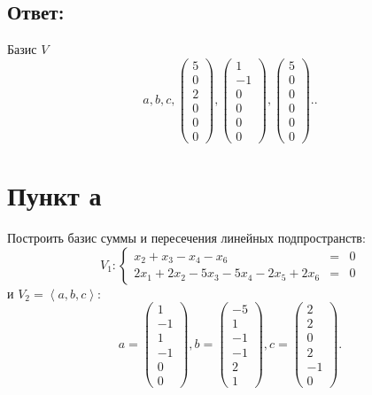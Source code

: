 \documentclass[12pt]{article}
\begin{document}
    \subsection*{Ответ:}
    Базис $V$
    \[
        a, b, c ,
        \begin{pmatrix}
            5 \\ 0 \\ 2 \\ 0 \\ 0 \\ 0
        \end{pmatrix} ,
        \begin{pmatrix}
            1 \\ -1 \\ 0 \\ 0 \\ 0 \\ 0
        \end{pmatrix} ,
        \begin{pmatrix}
            5 \\ 0 \\ 0 \\ 0 \\ 0 \\ 0
        \end{pmatrix} .
        .
    \]

    \section*{Пункт а}
    Построить базис суммы и пересечения линейных подпространств:
    \[
        V_1 :
        \left \{
        \begin{array}{rcl}
            x_2 + x_3 - x_4 - x_6                         & = & 0 \\
            2 x_1 + 2 x_2 - 5 x_3 - 5 x_4 - 2 x_5 + 2 x_6 & = & 0
        \end{array}
        \right .
    \]
    и $V_2 = \left < a, b, c \right >$:
    \[
        a =
        \begin{pmatrix}
            1 \\ -1 \\ 1 \\ -1 \\ 0 \\ 0
        \end{pmatrix},
        b =
        \begin{pmatrix}
            -5 \\ 1 \\ -1 \\ -1 \\ 2 \\ 1
        \end{pmatrix},
        c =
        \begin{pmatrix}
            2 \\ 2 \\ 0 \\ 2 \\ -1 \\ 0
        \end{pmatrix} .
    \]
\end{document}
